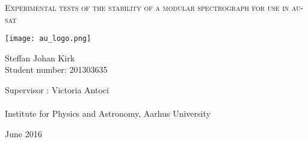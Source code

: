
\begin{titlingpage}

\begin{center}

\vspace*{0cm}
\huge
\textsc{Experimental tests of the stability of a modular spectrograph for use in au-sat}\\
\vspace{1.5cm}

\texttt{[image: au\_logo.png]}

\vspace{1cm}

\large
{
    Steffan Johan Kirk\\
    Student number: 201303635
    ~
   
}


\vspace{1cm}

{
  Supervisor : Victoria Antoci\\
  
  ~\\
  Institute for Physics and Astronomy, Aarhus University
}

\vspace{0.5cm}
{June 2016}\\


\end{center}



\end{titlingpage}
